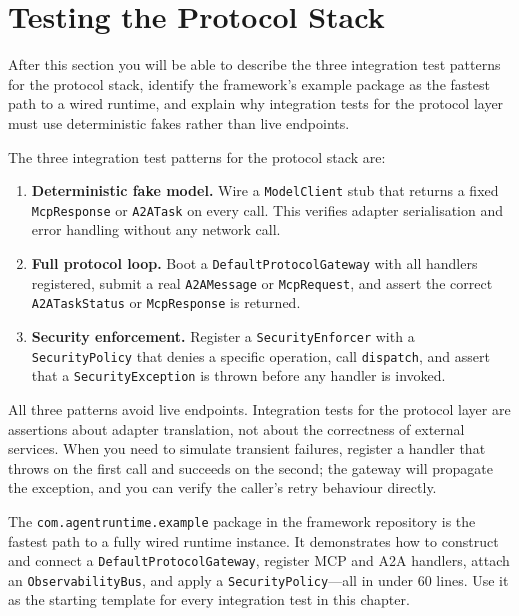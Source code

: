 \section{Testing the Protocol Stack}
\label{sec:testing-harness}

\begin{learningbox}
After this section you will be able to describe the three
integration test patterns for the protocol stack, identify the
framework's example package as the fastest path to a wired runtime,
and explain why integration tests for the protocol layer must use
deterministic fakes rather than live endpoints.
\end{learningbox}

The three integration test patterns for the protocol stack are:

\begin{enumerate}
  \item \textbf{Deterministic fake model.}  Wire a
        \lstinline{ModelClient} stub that returns a
        fixed \lstinline{McpResponse} or
        \lstinline{A2ATask} on every call.  This verifies
        adapter serialisation and error handling without any
        network call.
  \item \textbf{Full protocol loop.}  Boot a
        \lstinline{DefaultProtocolGateway} with all handlers
        registered, submit a real \lstinline{A2AMessage} or
        \lstinline{McpRequest}, and assert the correct
        \lstinline{A2ATaskStatus} or \lstinline{McpResponse}
        is returned.
  \item \textbf{Security enforcement.}  Register a
        \lstinline{SecurityEnforcer} with a
        \lstinline{SecurityPolicy} that denies a specific
        operation, call \lstinline{dispatch}, and assert that a
        \lstinline{SecurityException} is thrown before any
        handler is invoked.
\end{enumerate}

All three patterns avoid live endpoints.  Integration tests for the
protocol layer are assertions about adapter translation, not about
the correctness of external services.  When you need to simulate
transient failures, register a handler that throws on the first
call and succeeds on the second; the gateway will propagate the
exception, and you can verify the caller's retry behaviour directly.

\begin{tipbox}
The \lstinline{com.agentruntime.example} package in the framework
repository is the fastest path to a fully wired runtime instance.
It demonstrates how to construct and connect a
\lstinline{DefaultProtocolGateway}, register MCP and A2A handlers,
attach an \lstinline{ObservabilityBus}, and apply a
\lstinline{SecurityPolicy}---all in under 60 lines.  Use it as the
starting template for every integration test in this chapter.
\end{tipbox}

